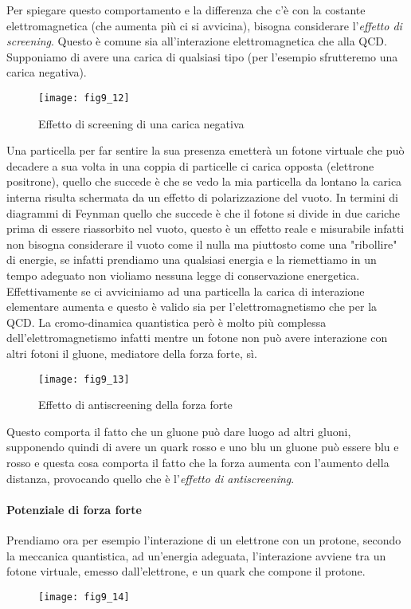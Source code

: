 Per spiegare questo comportamento e la differenza che c'è con la costante elettromagnetica (che aumenta più ci si avvicina), bisogna considerare l'\emph{effetto di screening}.
Questo è comune sia all'interazione elettromagnetica che alla QCD.
Supponiamo di avere una carica di qualsiasi tipo (per l'esempio sfrutteremo una carica negativa).
\begin{figure}[h]
\centering
\texttt{[image: fig9\_12]}
\caption{Effetto di screening di una carica negativa}
\end{figure}

Una particella per far sentire la sua presenza emetterà un fotone virtuale che può decadere a sua volta in una coppia di particelle ci carica opposta (elettrone positrone), quello che succede è che se vedo la mia particella da lontano la carica interna risulta schermata da un effetto di polarizzazione del vuoto.
In termini di diagrammi di Feynman quello che succede è che il fotone si divide in due cariche prima di essere riassorbito nel vuoto, questo è un effetto reale e misurabile infatti non bisogna considerare il vuoto come il nulla ma piuttosto come una "ribollire" di energie, se infatti prendiamo una qualsiasi energia e la riemettiamo in un tempo adeguato non violiamo nessuna legge di conservazione energetica.
Effettivamente se ci avviciniamo ad una particella la carica di interazione elementare aumenta e questo è valido sia per l'elettromagnetismo che per la QCD.
La cromo-dinamica quantistica però è molto più complessa dell'elettromagnetismo infatti mentre un fotone non può avere interazione con altri fotoni il gluone, mediatore della forza forte, sì.
\begin{figure}[h]
\centering
\texttt{[image: fig9\_13]}
\caption{Effetto di antiscreening della forza forte}
\end{figure}

Questo comporta il fatto che un gluone può dare luogo ad altri gluoni, supponendo quindi di avere un quark rosso e uno blu un gluone può essere blu e rosso e questa cosa comporta il fatto che la forza aumenta con l'aumento della distanza, provocando quello che è l'\emph{effetto di antiscreening}.

\paragraph{Potenziale di forza forte}
Prendiamo ora per esempio l'interazione di un elettrone con un protone, secondo la meccanica quantistica, ad un'energia adeguata, l'interazione avviene tra un fotone virtuale, emesso dall'elettrone, e un quark che compone il protone.
\begin{figure}[h]
\centering
\texttt{[image: fig9\_14]}
\end{figure}

